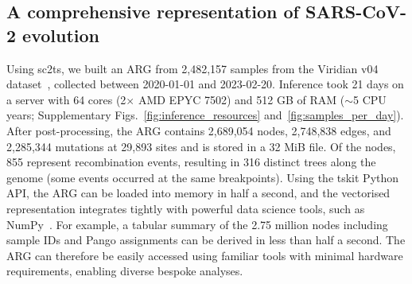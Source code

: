 \documentclass[12pt]{article}
\makeatletter
\newcommand{\refprefix}[1]{#1~}
\newcommand{\numref}[1]{{\let\refprefix\@gobble\ref{#1}}}
\makeatother
\begin{document}
\subsection*{A comprehensive representation of SARS-CoV-2 evolution}

Using sc2ts, we built an ARG from 2,482,157 samples
from the Viridian v04 dataset~\cite{Hunt2024},
collected between 2020-01-01 and 2023-02-20.
Inference took 21 days on a server with
64 cores (2$\times$ AMD EPYC 7502) and 512 GB of RAM
($\sim$5 CPU years;
Supplementary Figs.~\numref{fig:inference_resources} and~\numref{fig:samples_per_day}).
After post-processing, the ARG contains
2,689,054 nodes,  %
2,748,838 edges, and
2,285,344 mutations
at 29,893 sites
and is stored in a 32 MiB file.
Of the nodes, 855 represent recombination events,
resulting in 316 distinct trees along the genome
(some events occurred at the same breakpoints).
Using the tskit Python API,
the ARG can be loaded into memory in half a second,
and the vectorised representation integrates tightly
with powerful data science tools, such as NumPy~\cite{Harris2020array}.
For example, a tabular summary of the 2.75 million nodes
including sample IDs and Pango assignments
can be derived in less than half a second.
The ARG can therefore be easily accessed using familiar tools
with minimal hardware requirements, enabling diverse bespoke analyses.

\end{document}
